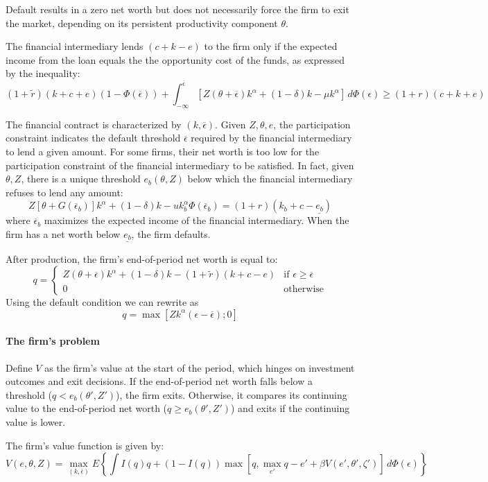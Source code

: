 \documentclass[12pt]{report}
\begin{document}
Default results in a zero net worth but does not necessarily force the firm to exit the market, depending on its
persistent productivity component $\theta$.

The financial intermediary lends $(c + k - e)$ to the firm only if the expected income from the loan equals the
the opportunity cost of the funds, as expressed by the inequality:
\[
(1+\widetilde{r} )(k+c+e)(1-\Phi(\overline{\epsilon}))+\int_{-\infty}^{\overline{\epsilon}}[Z(\theta+\overline{\epsilon})
k^\alpha+(1-\delta)k-\mu k^\alpha] \,d\Phi(\epsilon) \geq (1+r)(c+k+e)
\]

The financial contract is characterized by $(k,\overline{\epsilon})$. Given $Z,\theta,e$, the participation constraint
indicates the default threshold $\overline{\epsilon}$ required by the financial intermediary to lend a given amount. For
some firms, their net worth is too low for the participation constraint of the financial intermediary to be satisfied.
In fact, given $\theta, Z$, there is a unique threshold $e_b(\theta,Z)$ below which the financial intermediary
refuses to lend any amount:
\[
Z[\theta+G(\overline{\epsilon}_b )]k^\alpha+(1-\delta)k-uk_b^\alpha\Phi (\overline{\epsilon}_b)=(1+r)(k_b+c-\underline{e_b})
\]
where $\overline{\epsilon}_b$ maximizes the expected income of the financial intermediary. When the firm has a net worth
below $\underline{e_b}$, the firm defaults.

After production, the firm's end-of-period net worth is equal to:
\[
q = \begin{cases}
  Z(\theta+\overline{\epsilon})k^\alpha +(1-\delta)k-(1+\widetilde{r})(k+c-e) & \text{if } \epsilon\geq \overline{\epsilon} \\
  0 & \text{otherwise}
\end{cases}
\]
Using the default condition we can rewrite as 
\[q = \max[Zk^\alpha(\epsilon-\overline{\epsilon});0]\]

\paragraph{The firm's problem}
Define $V$ as the firm's value at the start of the period, which hinges on investment outcomes and exit decisions. If
the end-of-period net worth falls below a threshold ($q < e_b(\theta', Z')$), the firm exits. Otherwise, it compares its
continuing value to the end-of-period net worth ($q \geq e_b(\theta', Z')$) and exits if the continuing value is lower.

The firm's value function is given by:
\[
V(e,\theta,Z) = \max_{(k,\overline{\epsilon})}E\left\{\int I(q)q + (1-I(q))\max[q,\max_{e'}q-e'+\beta V(e',\theta',
\zeta')]\,d\Phi(\epsilon)\right\}
\]
\end{document}
